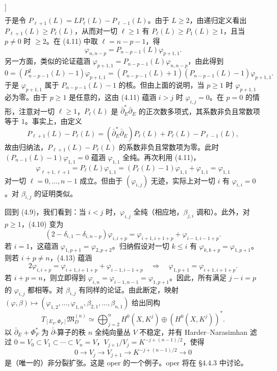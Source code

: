\begin{example}[参看 [35, 38]]
\[\begin{aligned}
\end{aligned}
\]
于是令 $P_{\ell+1}(L)=LP_\ell(L)-P_{\ell-1}(L)$。由于 $L\ge2$，由递归定义看出 $P_{\ell+1}(L)\ge P_\ell(L)$，从而对一切 $\ell\ge1$ 有 $P_\ell(L)\ge P_1(L)\ge1$，且当 $p\ne0$ 时 $\ge2$。在 (4.11) 中取 $\ell=n-p-1$，得
\begin{equation}
\varphi_{n,n-p}=P_{n-p-1}(L)\varphi_{p+1,1}.
\label{eq:4.12}\tag{4.12}
\end{equation}
另一方面，类似的论证蕴涵 $\varphi_{p+1,1}=P_{n-p-1}(L)\varphi_{n,n-p}$，由此得到
\[
0=(P^2_{n-p-1}(L)-1)\varphi_{p+1,1}=(P_{n-p-1}(L)+1)(P_{n-p-1}(L)-1)\varphi_{p+1,1}.
\]
于是 $\varphi_{p+1,1}$ 属于 $P_{n-p-1}(L)-1$ 的核。但由上面的说明，当 $p\ge1$ 时 $\varphi_{p+1,1}$ 必为零。由于 $p\ge1$ 是任意的，这由 (4.11) 蕴涵 $i>j$ 时 $\varphi_{i,j}=0$。在 $p=0$ 的情形，注意对一切 $\ell\ge1$，$P_\ell(L)$ 是 $\bar\partial^*_E\bar\partial_E$ 的正次数多项式，其系数非负且常数项等于 $1$。事实上，由定义
\[
P_{\ell+1}(L)-P_\ell(L)=(\bar\partial^*_E\bar\partial_E)P_\ell(L)+P_\ell(L)-P_{\ell-1}(L),
\]
故由归纳法，$P_{\ell+1}(L)-P_\ell(L)$ 的系数非负且常数项为零。此时 $(P_{n-1}(L)-1)\varphi_{1,1}=0$ 蕴涵 $\varphi_{1,1}$ 全纯。再次利用 (4.11)，
\[
\varphi_{\ell+1,\ell+1}=P_\ell(L)\varphi_{1,1}=(P_\ell(L)-1)\varphi_{1,1}+\varphi_{1,1}=\varphi_{1,1}
\]
对一切 $\ell=0,\dots,n-1$ 成立。但由于 $(\varphi_{i,j})$ 无迹，实际上对一切 $i$ 有 $\varphi_{i,i}=0$。对 $\beta_{i,j}$ 的证明类似。

回到 (4.9)，我们看到：当 $i<j$ 时，$\varphi_{i,j}$ 全纯（相应地，$\beta_{j,i}$ 调和）。此外，对 $p\ge1$，(4.10) 变为
\begin{equation}
(2-\delta_{i,1}-\delta_{i,n-p})\varphi_{i,i+p}=\varphi_{i+1,i+1+p}+\varphi_{i-1,i-1+p}.
\label{eq:4.13}\tag{4.13}
\end{equation}
若 $i=1$，这蕴涵 $\varphi_{1,p+1}=\varphi_{2,p+2}$。归纳假设对一切 $k\le i$ 有 $\varphi_{k,k+p}=\varphi_{1,p+1}$。则若 $i+p\ne n$，(4.13) 蕴涵
\[
2\varphi_{i,i+p}=\varphi_{i+1,i+1+p}+\varphi_{i-1,i-1+p}\quad\Longrightarrow\quad\varphi_{1,p+1}=\varphi_{i+1,i+1+p}.
\]
若 $i+p=n$，则立即得到 $\varphi_{i,n}=\varphi_{i-1,n-1}=\varphi_{1,p+1}$。因此，所有满足 $j-i=p$ 的 $\varphi_{i,j}$ 都相等。对 $\beta_{i,j}$ 有同样的论证。由此断定，映射 $(\varphi,\beta)\mapsto(\varphi_{1,2},\dots,\varphi_{1,n},\beta_{2,1},\dots,\beta_{n,1})$ 给出同构
\begin{equation}
T_{[E_F,\Phi_F]}\mathfrak{M}_D^{(n)}\simeq\bigoplus_{j=2}^{n}H^0(X,K^j)\oplus(H^0(X,K^j))^*.
\label{eq:4.14}\tag{4.14}
\end{equation}
以 $\bar\partial_E+\Phi^*_F$ 为 $\bar\partial$-算子的秩 $n$ 全纯向量丛 $V$ 不稳定，并有 Harder--Narasimhan 滤过 $0=V_0\subset V_1\subset\cdots\subset V_n=V$，$V_{j+1}/V_j=K^{-j+(n-1)/2}$，使得
\[
0\longrightarrow V_j\longrightarrow V_{j+1}\longrightarrow K^{-j+(n-1)/2}\longrightarrow0
\]
是（唯一的）非分裂扩张。这是 oper 的一个例子。oper 将在 §4.4.3 中讨论。
\end{example}

